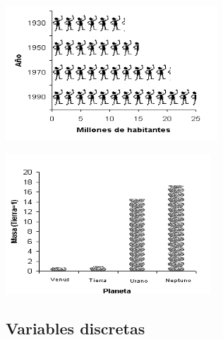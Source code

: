 \documentclass[]{article}
\begin{document}
\begin{itemize}
		\begin{minipage}[t]{.45\linewidth}
		\raggedleft
		\vspace*{0pt}
		\begin{center}
			\includegraphics[scale = 0.5]{picto1}
		\end{center}
		\end{minipage}%
		\begin{minipage}[t]{.45\linewidth}
			\vspace*{0pt}
			\raggedleft
			\begin{center}
				\includegraphics[scale = 0.5]{picto2}
			\end{center}
		\end{minipage}
	\end{itemize}
	
	\subsection{Variables discretas}
	
\end{document}
